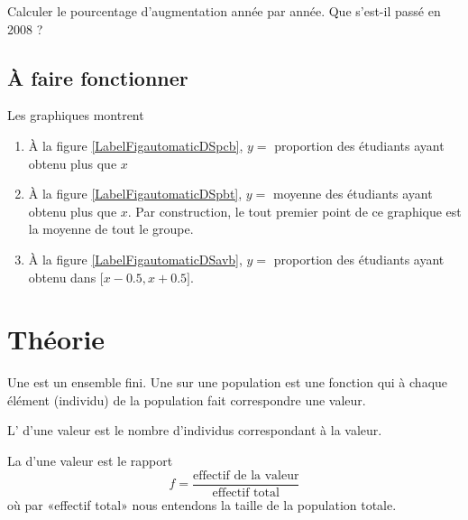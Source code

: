 Calculer le pourcentage d'augmentation année par année. Que s'est-il passé en 2008 ?

\subsection{À faire fonctionner}

Les graphiques montrent
\begin{enumerate}
    \item

        À la figure \ref{LabelFigautomaticDSpcb}, \( y=\) proportion des étudiants ayant obtenu plus que \( x\)
    \item
        À la figure \ref{LabelFigautomaticDSpbt}, \( y=\) moyenne des étudiants ayant obtenu plus que \( x\). Par construction, le tout premier point de ce graphique est la moyenne de tout le groupe.
    \item
        À la figure \ref{LabelFigautomaticDSavb}, \( y=\) proportion des étudiants ayant obtenu dans \( \mathopen[ x-0.5 , x+0.5 \mathclose]\).
\end{enumerate}

\newcommand{\CaptionFigautomaticDSpcb}{Moyenne des étudiants ayant obtenus plus que \( x\)}


\newcommand{\CaptionFigautomaticDSpbt}{Proportion des étudiants ayant obtenus plus que \( x\)}


\newcommand{\CaptionFigautomaticDSavb}{proportion des étudiants ayant obtenu dans \( x\pm 0.5\)}


\section{Théorie}

\begin{definition}
    Une  est un ensemble fini. Une  sur une population est une fonction qui à chaque élément (individu) de la population fait correspondre une valeur.

    L' d'une valeur est le nombre d'individus correspondant à la valeur.

    La  d'une valeur est le rapport
    \begin{equation}
        f=\frac{ \text{effectif de la valeur} }{ \text{effectif total} }
    \end{equation}
    où par «effectif total» nous entendons la taille de la population totale.
\end{definition}


